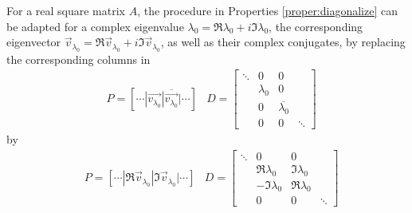 \begin{proper}
\label{proper:diagonalize2}
For a real square matrix $A$, the procedure in Properties \ref{proper:diagonalize} can be adapted for a complex eigenvalue $\lambda_0 = \Re{\lambda_0} + i \Im{\lambda_0}$, the corresponding eigenvector $\vec{v}_{\lambda_0} = \Re{\vec{v}_{\lambda_0}} + i \Im{\vec{v}_{\lambda_0}}$, as well as their complex conjugates, by replacing the corresponding columns in
\begin{align*}
&P = [\cdots|\vec{v_{\lambda_0}}|\overline{\vec{v_{\lambda_0}}}|\cdots]
&D =
\begin{bmatrix}
\ddots & 0 & 0 & \\
& \lambda_0 & 0 & \\
& 0 & \overline{\lambda_0} & \\
& 0 & 0 & \ddots
\end{bmatrix}
\end{align*}
by
\begin{align}
&P = [\cdots|\Re{\vec{v}_{\lambda_0}}|\Im{\vec{v}_{\lambda_0}}|\cdots]
&D =
\begin{bmatrix}
\ddots & 0 & 0 & \\
& \Re{\lambda_0} & \Im{\lambda_0} & \\
& -\Im{\lambda_0} & \Re{\lambda_0} & \\
& 0 & 0 & \ddots
\end{bmatrix}
\label{eqn:diagonalize2}
\end{align}
\end{proper}
